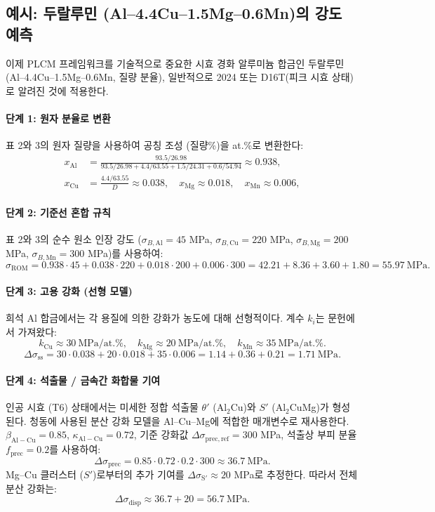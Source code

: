 \documentclass[12pt,a4paper]{article}
\begin{document}
	\subsection{예시: 두랄루민 (Al–4.4Cu–1.5Mg–0.6Mn)의 강도 예측}
	\label{subsec:example-duralumin}
	
	이제 PLCM 프레임워크를 기술적으로 중요한 시효 경화 알루미늄 합금인 두랄루민 (Al–4.4Cu–1.5Mg–0.6Mn, 질량 분율), 일반적으로 2024 또는 D16T(피크 시효 상태)로 알려진 것에 적용한다.
	
	\paragraph{단계 1: 원자 분율로 변환}
	표 2와 3의 원자 질량을 사용하여 공칭 조성 (질량\%)을 at.\%로 변환한다:
	\[
	\begin{aligned}
		x_{\mathrm{Al}} &= \frac{93.5/26.98}{93.5/26.98+4.4/63.55+1.5/24.31+0.6/54.94} \approx 0.938,\\
		x_{\mathrm{Cu}} &= \frac{4.4/63.55}{D} \approx 0.038,\quad
		x_{\mathrm{Mg}} \approx 0.018,\quad
		x_{\mathrm{Mn}} \approx 0.006,
	\end{aligned}
	\]
	
	\paragraph{단계 2: 기준선 혼합 규칙}
	표 2와 3의 순수 원소 인장 강도 (\(\sigma_{B,\mathrm{Al}}=45\) MPa, \(\sigma_{B,\mathrm{Cu}}=220\) MPa, \(\sigma_{B,\mathrm{Mg}}=200\) MPa, \(\sigma_{B,\mathrm{Mn}}=300\) MPa)를 사용하여:
	\[
	\sigma_{\mathrm{ROM}} = 0.938\cdot45 + 0.038\cdot220 + 0.018\cdot200 + 0.006\cdot300
	= 42.21 + 8.36 + 3.60 + 1.80 = 55.97\ \text{MPa}.
	\]
	
	\paragraph{단계 3: 고용 강화 (선형 모델)}
	희석 Al 합금에서는 각 용질에 의한 강화가 농도에 대해 선형적이다. 계수 \(k_i\)는 문헌에서 가져왔다:
	\[
	k_{\mathrm{Cu}} \approx 30\ \text{MPa/at.\%},\quad
	k_{\mathrm{Mg}} \approx 20\ \text{MPa/at.\%},\quad
	k_{\mathrm{Mn}} \approx 35\ \text{MPa/at.\%}.
	\]
	\[
	\Delta\sigma_{\mathrm{ss}} = 30\cdot0.038 + 20\cdot0.018 + 35\cdot0.006
	= 1.14 + 0.36 + 0.21 = 1.71\ \text{MPa}.
	\]
	
	\paragraph{단계 4: 석출물 / 금속간 화합물 기여}
	인공 시효 (T6) 상태에서는 미세한 정합 석출물 \(\theta'\) (Al\(_2\)Cu)와 \(S'\) (Al\(_2\)CuMg)가 형성된다. 청동에 사용된 분산 강화 모델을 Al–Cu–Mg에 적합한 매개변수로 재사용한다. \(\beta_{\mathrm{Al-Cu}}=0.85\), \(\kappa_{\mathrm{Al-Cu}}=0.72\), 기준 강화값 \(\Delta\sigma_{\mathrm{prec,ref}}=300\) MPa, 석출상 부피 분율 \(f_{\mathrm{prec}}=0.2\)를 사용하여:
	\[
	\Delta\sigma_{\mathrm{prec}} = 0.85\cdot0.72\cdot0.2\cdot300 \approx 36.7\ \text{MPa}.
	\]
	Mg–Cu 클러스터 (\(S'\))로부터의 추가 기여를 \(\Delta\sigma_{\mathrm{S'}} \approx 20\) MPa로 추정한다. 따라서 전체 분산 강화는:
	\[
	\Delta\sigma_{\mathrm{disp}} \approx 36.7 + 20 = 56.7\ \text{MPa}.
	\]
	
\end{document}
